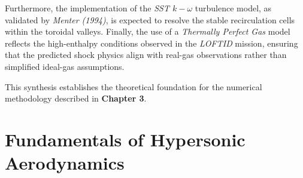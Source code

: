 Furthermore, the implementation of the \textit{SST $k-\omega$} turbulence model, as validated by \textit{Menter (1994)}, is expected to resolve the stable recirculation cells within the toroidal valleys. Finally, the use of a \textit{Thermally Perfect Gas} model reflects the high-enthalpy conditions observed in the \textit{LOFTID} mission, ensuring that the predicted shock physics align with real-gas observations rather than simplified ideal-gas assumptions.

This synthesis establishes the theoretical foundation for the numerical methodology described in \textbf{Chapter 3}.

\section{Fundamentals of Hypersonic Aerodynamics}

